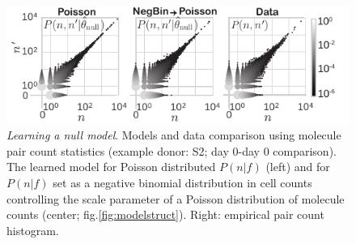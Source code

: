 \documentclass[letterpaper,english,prl,reprint,longbibliography]{revtex4-1} %
\begin{document}
\begin{figure}[ht!]
\includegraphics{fig1_nullmodel_v5}
\centering{}
\caption{
\emph{Learning a null model}.  Models and data comparison using molecule pair count statistics (example donor: S2; day 0-day 0 comparison). The learned model for Poisson distributed $P(n|f)$ (left) and for $P(n|f)$ set as a negative binomial distribution in cell counts controlling the scale parameter of a Poisson distribution of molecule counts (center; fig.\ref{fig:modelstruct}). Right: empirical pair count histogram.  
\label{fig:nullstats}}
\end{figure}
\end{document}
